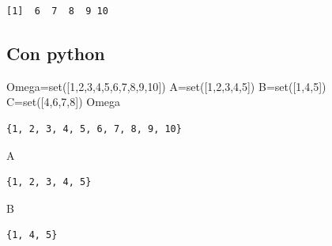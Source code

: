 \documentclass[
  letterpaper,
  DIV=11,
  numbers=noendperiod]{scrreprt}
\newenvironment{Shaded}{\begin{snugshade}}{\end{snugshade}}
\newcommand{\BuiltInTok}[1]{\textcolor[rgb]{0.00,0.23,0.31}{#1}}
\newcommand{\DecValTok}[1]{\textcolor[rgb]{0.68,0.00,0.00}{#1}}
\newcommand{\NormalTok}[1]{\textcolor[rgb]{0.00,0.23,0.31}{#1}}
\newcommand{\OperatorTok}[1]{\textcolor[rgb]{0.37,0.37,0.37}{#1}}
\begin{document}
\begin{verbatim}
[1]  6  7  8  9 10
\end{verbatim}

\subsection{Con python}\label{con-python}

\begin{Shaded}
\begin{Highlighting}[]
\NormalTok{Omega}\OperatorTok{=}\BuiltInTok{set}\NormalTok{([}\DecValTok{1}\NormalTok{,}\DecValTok{2}\NormalTok{,}\DecValTok{3}\NormalTok{,}\DecValTok{4}\NormalTok{,}\DecValTok{5}\NormalTok{,}\DecValTok{6}\NormalTok{,}\DecValTok{7}\NormalTok{,}\DecValTok{8}\NormalTok{,}\DecValTok{9}\NormalTok{,}\DecValTok{10}\NormalTok{])}
\NormalTok{A}\OperatorTok{=}\BuiltInTok{set}\NormalTok{([}\DecValTok{1}\NormalTok{,}\DecValTok{2}\NormalTok{,}\DecValTok{3}\NormalTok{,}\DecValTok{4}\NormalTok{,}\DecValTok{5}\NormalTok{])}
\NormalTok{B}\OperatorTok{=}\BuiltInTok{set}\NormalTok{([}\DecValTok{1}\NormalTok{,}\DecValTok{4}\NormalTok{,}\DecValTok{5}\NormalTok{])}
\NormalTok{C}\OperatorTok{=}\BuiltInTok{set}\NormalTok{([}\DecValTok{4}\NormalTok{,}\DecValTok{6}\NormalTok{,}\DecValTok{7}\NormalTok{,}\DecValTok{8}\NormalTok{])}
\NormalTok{Omega}
\end{Highlighting}
\end{Shaded}

\begin{verbatim}
{1, 2, 3, 4, 5, 6, 7, 8, 9, 10}
\end{verbatim}

\begin{Shaded}
\begin{Highlighting}[]
\NormalTok{A}
\end{Highlighting}
\end{Shaded}

\begin{verbatim}
{1, 2, 3, 4, 5}
\end{verbatim}

\begin{Shaded}
\begin{Highlighting}[]
\NormalTok{B}
\end{Highlighting}
\end{Shaded}

\begin{verbatim}
{1, 4, 5}
\end{verbatim}
\end{document}
